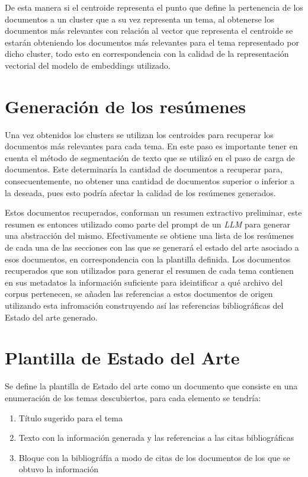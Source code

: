 
    De esta manera si el centroide representa el punto que define la pertenencia de los documentos a un cluster que a su vez representa un tema, al obtenerse los documentos más relevantes con relación al vector que representa el centroide se estarán obteniendo los documentos más relevantes para el tema representado por dicho cluster, todo esto en correspondencia con la calidad de la representación vectorial del modelo de embeddings utilizado.
\section{Generación de los resúmenes}
    Una vez obtenidos los clusters se utilizan los centroides para recuperar los documentos más relevantes para cada tema. En este paso es importante tener en cuenta el método de segmentación de texto que se utilizó en el paso de carga de documentos. Este determinaría la cantidad de documentos a recuperar para, consecuentemente, no obtener una cantidad de documentos superior o inferior a la deseada, pues esto podría afectar la calidad de los resúmenes generados.
    
    Estos documentos recuperados, conforman un resumen extractivo preliminar, este resumen es entonces utilizado como parte del prompt de un \emph{LLM} para generar una abstracción del mismo. Efectivamente se obtiene una lista de los resúmenes de cada una de las secciones con las que se generará el estado del arte asociado a esos documentos, en correspondencia con la plantilla definida.
    Los documentos recuperados que son utilizados para generar el resumen de cada tema contienen en sus metadatos la información suficiente para ideintificar a qué archivo del corpus pertenecen, se añaden las referencias a estos documentos de origen utilizando esta infromación construyendo así las referencias bibliográficas del Estado del arte generado.

  

\section{Plantilla de Estado del Arte}
Se define la plantilla de Estado del arte como un documento que consiste en una enumeración de los temas descubiertos, 
para cada elemento se tendría:
\begin{enumerate}
    \item Título sugerido para el tema
    \item Texto con la información generada y las referencias a las citas bibliográficas
    \item Bloque con la bibliográfía a modo de citas de los documentos de los que se obtuvo la información
\end{enumerate} 
